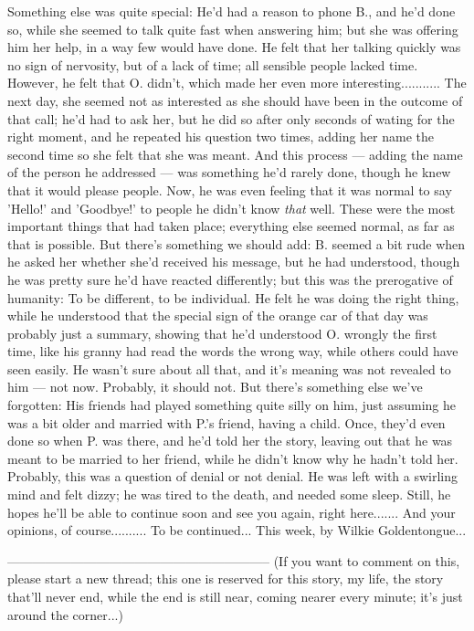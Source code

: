 Something else was quite special: He'd had a reason to phone B., and he'd done so, while she seemed to talk quite fast when answering him; but she was offering him her help, in a way few would have done. He felt that her talking quickly was no sign of nervosity, but of a lack of time; all sensible people lacked time. However, he felt that O. didn't, which made her even more interesting...........
The next day, she seemed not as interested as she should have been in the outcome of that call; he'd had to ask her, but he did so after only seconds of wating for the right moment, and he repeated his question two times, adding her name the second time so she felt that she was meant. 
And this process --- adding the name of the person he addressed --- was something he'd rarely done, though he knew that it would please people. Now, he was even feeling that it was normal to say 'Hello!' and 'Goodbye!' to people he didn't know \emph{that} well. 
These were the most important things that had taken place; everything else seemed normal, as far as that is possible. But there's something we should add: B. seemed a bit rude when he asked her whether she'd received his message, but he had understood, though he was pretty sure he'd have reacted differently; but this was the prerogative of humanity: To be different, to be individual. 
He felt he was doing the right thing, while he understood that the special sign of the orange car of that day was probably just a summary, showing that he'd understood O. wrongly the first time, like his granny had read the words the wrong way, while others could have seen easily. He wasn't sure about all that, and it's meaning was not revealed to him --- not now. Probably, it should not. 
But there's something else we've forgotten: His friends had played something quite silly on him, just assuming he was a bit older and married with P.'s friend, having a child. Once, they'd even done so when P. was there, and he'd told her the story, leaving out that he was meant to be married to her friend, while he didn't know why he hadn't told her. Probably, this was a question of denial or not denial. 
He was left with a swirling mind and felt dizzy; he was tired to the death, and needed some sleep. 
Still, he hopes he'll be able to continue soon and see you again, right here.......
And your opinions, of course..........
To be continued...
This week, by Wilkie Goldentongue...

--------------------------------------------------------------
(If you want to comment on this, please start a new thread; this one is reserved for this story, my life, the story that'll never end, while the end is still near, coming nearer every minute; it's just around the corner...)

